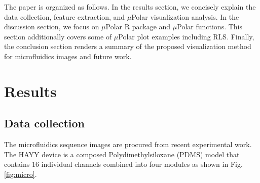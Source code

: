 \documentclass[conference]{IEEEtran}
\begin{document}
The paper is organized as follows. In the results section, we concisely explain the data collection, feature extraction, and $\mu$Polar visualization analysis. In the discussion section, we focus on $\mu$Polar R package and $\mu$Polar functions. This section additionally covers some of $\mu$Polar plot examples including RLS. Finally, the conclusion section renders a summary of the proposed visualization method for microfluidics images and future work.







 




\section{Results}

\subsection*{Data collection}
The microfluidics sequence images are procured from \cite{ref13} recent experimental work. The HAYY device is a composed Polydimethylsiloxane (PDMS) model that contains 16 individual channels combined into four modules as shown in Fig.\ref{fig:micro}.
\end{document}

